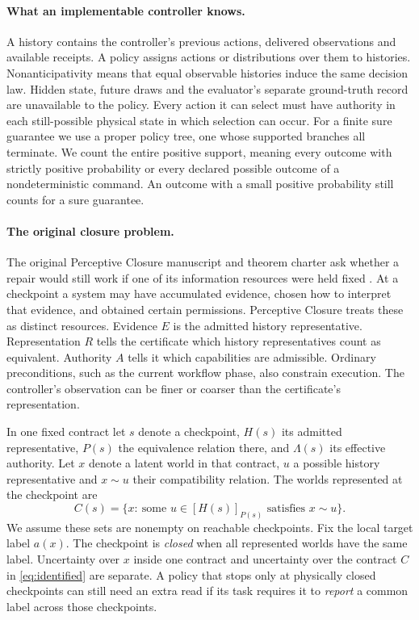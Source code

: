 \paragraph{What an implementable controller knows.}
A history contains the controller's previous actions, delivered observations and available receipts. A policy assigns actions or distributions over them to histories. Nonanticipativity means that equal observable histories induce the same decision law. Hidden state, future draws and the evaluator's separate ground-truth record are unavailable to the policy. Every action it can select must have authority in each still-possible physical state in which selection can occur. For a finite sure guarantee we use a proper policy tree, one whose supported branches all terminate. We count the entire positive support, meaning every outcome with strictly positive probability or every declared possible outcome of a nondeterministic command. An outcome with a small positive probability still counts for a sure guarantee.

\paragraph{The original closure problem.}
The original Perceptive Closure manuscript and theorem charter ask whether a repair would still work if one of its information resources were held fixed \citep{d35,charter}.
At a checkpoint a system may have accumulated evidence, chosen how to interpret that evidence, and obtained certain permissions. Perceptive Closure treats these as distinct resources. Evidence \(E\) is the admitted history representative. Representation \(R\) tells the certificate which history representatives count as equivalent. Authority \(A\) tells it which capabilities are admissible. Ordinary preconditions, such as the current workflow phase, also constrain execution. The controller's observation can be finer or coarser than the certificate's representation.

In one fixed contract let \(s\) denote a checkpoint, \(H(s)\) its admitted representative, \(P(s)\) the equivalence relation there, and \(\Lambda(s)\) its effective authority. Let \(x\) denote a latent world in that contract, \(u\) a possible history representative and \(x\sim u\) their compatibility relation. The worlds represented at the checkpoint are
\[
 C(s)=\{x:\ \text{some }u\in[H(s)]_{P(s)}\text{ satisfies }x\sim u\}.
\]
We assume these sets are nonempty on reachable checkpoints. Fix the local target label \(a(x)\). The checkpoint is \emph{closed} when all represented worlds have the same label. Uncertainty over \(x\) inside one contract and uncertainty over the contract \(C\) in \eqref{eq:identified} are separate. A policy that stops only at physically closed checkpoints can still need an extra read if its task requires it to \emph{report} a common label across those checkpoints.


